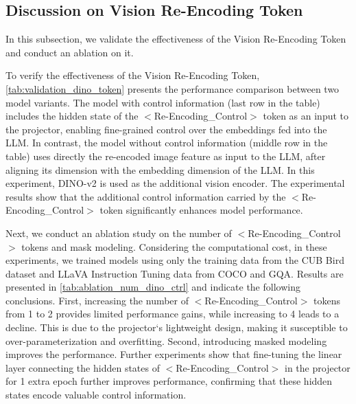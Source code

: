 \subsection{Discussion on Vision Re-Encoding Token}
In this subsection, we validate the effectiveness of the Vision Re-Encoding Token and conduct an ablation on it. 

To verify the effectiveness of the Vision Re-Encoding Token, \cref{tab:validation_dino_token} presents the performance comparison between two model variants. The model with control information (last row in the table) includes the hidden state of the $<$Re-Encoding\_Control$>$ token as an input to the projector, enabling fine-grained control over the embeddings fed into the LLM. 
In contrast, the model without control information  (middle row in the table) uses directly the re-encoded image feature as input to the LLM, after aligning its dimension with the embedding dimension of the LLM. In this experiment, DINO-v2 is used as the additional vision encoder.
The experimental results show that the additional control information carried by the $<$Re-Encoding\_Control$>$ token significantly enhances model performance.




Next, we conduct an ablation study on the number of $<$Re-Encoding\_Control$>$ tokens and mask modeling. Considering the computational cost, in these experiments, we trained  models using only the training data from the CUB Bird dataset and LLaVA Instruction Tuning data from COCO and GQA. 
Results are presented in \cref{tab:ablation_num_dino_ctrl} and indicate the following conclusions.
First, increasing the number of $<$Re-Encoding\_Control$>$ tokens from 1 to 2 provides limited performance gains, while increasing to 4 leads to a decline. This is due to the projector`s lightweight design, making it susceptible to over-parameterization and overfitting.  
Second, introducing masked modeling improves the performance. Further experiments show that fine-tuning the linear layer connecting the hidden states of $<$Re-Encoding\_Control$>$ in the projector for 1 extra epoch further improves performance, confirming that these hidden states encode valuable control information.